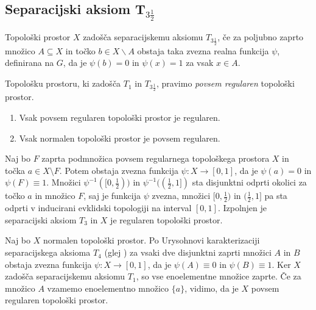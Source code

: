\documentclass[mat1]{fmfdelo}
\begin{document}
\subsection{Separacijski aksiom T$_{3 \frac{1}{2}}$}

\begin{definicija}
	Topološki prostor $X$ zadošča separacijskemu aksiomu $T_{3 \frac{1}{2}}$, če za poljubno zaprto množico $A \subseteq X$ in točko $b \in X\backslash A$ obstaja taka zvezna realna funkcija $\psi$, definirana na $G$, da je $\psi (b) = 0$ in $\psi (x) = 1$ za vsak $x \in A$.
\end{definicija}

\begin{opomba}
	Topološku prostoru, ki zadošča $T_1$ in $T_{3 \frac{1}{2}}$, pravimo \emph{povsem regularen} topološki prostor.
\end{opomba}


\begin{trditev}\label{pos:reghaus}
\begin{enumerate}
\item Vsak povsem regularen topološki prostor je regularen.
\item Vsak normalen topološki prostor je povsem regularen.
\end{enumerate}
\end{trditev}

\begin{dokaz}
Naj bo $F$ zaprta podmnožica povsem regularnega topološkega prostora $X$ in točka $a \in X \setminus F$. Potem obstaja zvezna funkcija $\psi\colon X \to [0, 1]$, da je $\psi(a) = 0$ in $\psi(F) \equiv 1$. Množici $\psi^{-1}([0, \frac{1}{2}))$ in $\psi^{-1}((\frac{1}{2}, 1])$ sta disjunktni odprti okolici za točko $a$ in množico $F$, saj je funkcija $\psi$ zvezna, množici $[0, \frac{1}{2})$ in $(\frac{1}{2}, 1]$ pa sta odprti v inducirani evklidski topologiji na interval $[0, 1]$.
Izpolnjen je separacijski aksiom $T_3$ in $X$ je regularen topološki prostor.

Naj bo $X$ normalen topološki prostor. Po Urysohnovi karakterizaciji separacijskega aksioma $T_4$ (glej \cite{bib:top}) za vsaki dve disjunktni zaprti množici $A$ in $B$ obstaja zvezna funkcija $\psi\colon X \to [0, 1]$, da je $\psi(A) \equiv 0 $ in $\psi(B) \equiv 1$. Ker $X$ zadošča separacijskemu aksiomu $T_1$, so vse enoelementne množice zaprte. Če za množico $A$ vzamemo enoelementno množico $\lbrace a \rbrace$, vidimo, da je $X$ povsem regularen topološki prostor.
\end{dokaz}
\end{document}

